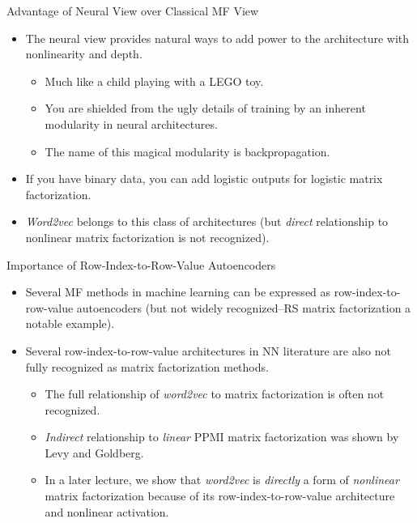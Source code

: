 \begin{frame}{Advantage of Neural View over Classical MF View}
\begin{itemize}
\item The neural view provides natural ways to add power to the
architecture with nonlinearity and depth.
\begin{itemize}
\item Much like a child playing with a
LEGO toy.
\item You are shielded from the ugly details of training by an
inherent modularity in neural architectures.
\item The name of this magical modularity is backpropagation.
\end{itemize}
\item If you have binary data, you can add logistic outputs for
logistic matrix factorization.
\item {\em Word2vec} belongs to  this class of
architectures (but  {\em direct} relationship to nonlinear matrix
factorization is not recognized).
\end{itemize}
\end{frame}


\begin{frame}{Importance of Row-Index-to-Row-Value Autoencoders}
\begin{itemize}
\item   Several MF methods in machine learning  can be
expressed as row-index-to-row-value autoencoders (but not widely
recognized--RS matrix factorization a notable example).
\item  Several  row-index-to-row-value architectures in NN literature  are also not fully recognized as matrix factorization
methods.
\begin{itemize}
\item The full relationship of {\em word2vec} to matrix
factorization is often not recognized.
\item {\em Indirect} relationship to {\em linear} PPMI matrix factorization was shown
by Levy and Goldberg. \item  In a later lecture, we show that {\em
word2vec} is {\em directly} a form of {\em nonlinear} matrix
factorization because of its row-index-to-row-value architecture and
nonlinear activation.
\end{itemize}
\end{itemize}
\end{frame}




